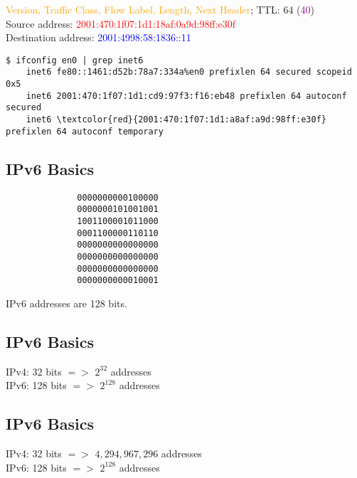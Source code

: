 \documentclass[xga]{xdvislides}
\begin{document}
\vspace{.15in}
\textcolor{orange}{Version, Traffic Class, Flow Label, Length, Next Header}; TTL: 64 (\textcolor{purple}{40}) \\
Source address: \textcolor{red}{2001:470:1f07:1d1:18af:0a9d:98ff:e30f} \\
Destination address: \textcolor{blue}{2001:4998:58:1836::11}
\vspace{.15in}

\begin{Verbatim}
$ ifconfig en0 | grep inet6
	inet6 fe80::1461:d52b:78a7:334a%en0 prefixlen 64 secured scopeid 0x5 
	inet6 2001:470:1f07:1d1:cd9:97f3:f16:eb48 prefixlen 64 autoconf secured 
	inet6 \textcolor{red}{2001:470:1f07:1d1:a8af:a9d:98ff:e30f} prefixlen 64 autoconf temporary 
\end{Verbatim}

\subsection{IPv6 Basics}
\Hugesize
\begin{center}
\begin{verbatim}
              0000000000100000
              0000000101001001
              1001100001011000
              0001100000110110
              0000000000000000
              0000000000000000
              0000000000000000
              0000000000010001
\end{verbatim}
\vspace{.5in}
IPv6 addresses are 128 bits.
\end{center}
\Normalsize

\subsection{IPv6 Basics}
\Hugesize
\begin{center}
IPv4: 32 bits $=>$ $2^{32}$ addresses \\
\vspace{.5in}
IPv6: 128 bits $=>$ $2^{128}$ addresses
\end{center}
\Normalsize

\subsection{IPv6 Basics}
\Hugesize
\begin{center}
IPv4: 32 bits $=>$ $4,294,967,296$ addresses \\
\vspace{.5in}
IPv6: 128 bits $=>$ $2^{128}$ addresses
\end{center}
\Normalsize
\end{document}
